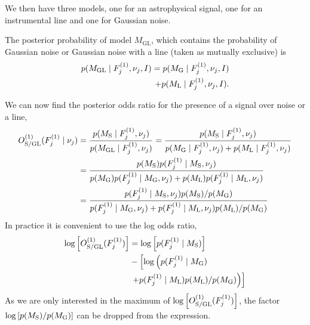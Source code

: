 We then have three models, one for an astrophysical signal, one for an instrumental line and one for Gaussian noise. 

The posterior probability of model $M_{\text{GL}}$, which contains the probability of Gaussian noise or Gaussian noise with a line (taken as mutually exclusive) is
\begin{equation}
\begin{split}
p(M_{\rm{GL}} \mid F^{(1)}_{j},\nu_j ,I) = p(M_{\rm{G}} \mid F^{(1)}_{j},\nu_j ,I) \\
+p(M_{\rm{L}} \mid F^{(1)}_{j} ,\nu_j, I).
\end{split}
\end{equation}


We can now find the posterior odds ratio for the presence of a signal over noise or a line,
\begin{equation}
\label{soap:odds:single}
\begin{split}
O^{(1)}_{\rm{S/GL}}(F^{(1)}_{j}\mid\nu_j) &=  \frac{p(M_{\rm{S}} \mid F^{(1)}_{j} ,\nu_j)}{p(M_{\rm{GL}} \mid F^{(1)}_{j},\nu_j)}
= \frac{p(M_{\rm{S}} \mid F^{(1)}_{j} ,\nu_j)}{p(M_{\rm{G}} \mid F^{(1)}_{j} ,\nu_j) +p(M_{\rm{L}} \mid F^{(1)}_{j} ,\nu_j)}\\
&=\frac{p(M_{\rm{S}})p(F^{(1)}_{j} \mid M_{\rm{S}},\nu_j)}{p(M_{\rm{G}})p(F^{(1)}_{j}\mid M_{\rm{G}},\nu_j) + p(M_{\rm{L}})p(F^{(1)}_{j}\mid M_{\rm{L}},\nu_j) } \\
&= \frac{p(F^{(1)}_{j} \mid M_{\rm{S}},\nu_j)p(M_{\rm{S}})/p(M_{\rm{G}})}{p(F^{(1)}_{j}\mid M_{\rm{G}},\nu_j) + p(F^{(1)}_{j}\mid M_{\rm{L}},\nu_j)p(M_{\rm{L}})/p(M_{\rm{G}}) }
\end{split}
\end{equation}
In practice it is convenient to use the log odds ratio,
\begin{equation}
\begin{split}
\label{soap:logodds:single}
\log\left[ O^{(1)}_{\rm{S/GL}}(F^{(1)}_{j})\right] &=  \log\left[ p(F^{(1)}_{j} \mid M_{\rm{S}}) \right] \\
&- \left[ \log\left( p(F^{(1)}_{j}\mid M_{\rm{G}}) \right. \right. \\
&\left.\left.+  p(F^{(1)}_{j}\mid M_{\rm{L}})p(M_{\rm{L}})/p(M_{\rm{G}})\right) \right]
\end{split}
\end{equation}
As we are only interested in the maximum of $\log\left[ O^{(1)}_{\rm{S/GL}}(F^{(1)}_{j})\right]$, the factor $\log\left[ p(M_{\rm{S}})/p(M_{\rm{G}})\right]$ can be dropped from the expression.

